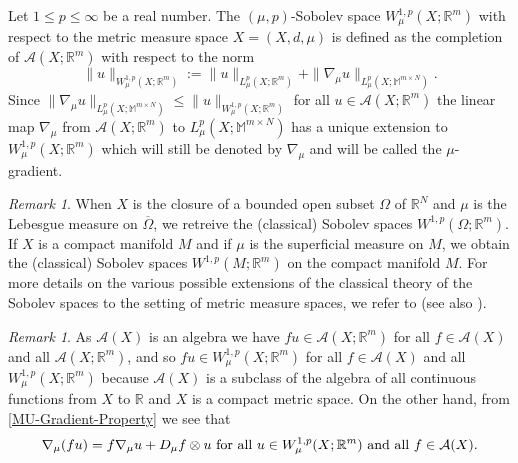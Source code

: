 \documentclass[10pt]{amsart}
\numberwithin{equation}{section}
\theoremstyle{definition}
\theoremstyle{remark}
\newtheorem{remark}[theorem]{Remark}
\begin{document}
Let $1\leq p\leq\infty$ be a real number. The $(\mu,p)$-Sobolev space $W^{1,p}_\mu(X;{{\mathbb R}}^m)$ with respect to the metric measure space $X=(X,d,\mu)$ is defined as the completion of $\mathcal{A}(X;{{\mathbb R}}^m)$ with respect to the norm
\begin{equation}\label{W1pmu-norm}
\|u\|_{W^{1,p}_\mu(X;{{\mathbb R}}^m)}:=\|u\|_{L^p_\mu(X;{{\mathbb R}}^m)}+\|\nabla_\mu u\|_{L_\mu^p(X;{{\mathbb M}^{m\times N}})}.
\end{equation}
Since $\|\nabla_\mu u\|_{L_\mu^p(X;{{\mathbb M}^{m\times N}})}\leq \|u\|_{W^{1,p}_\mu(X;{{\mathbb R}}^m)}$ for all $u\in\mathcal{A}(X;{{\mathbb R}}^m)$ the linear map $\nabla_\mu$ from $\mathcal{A}(X;{{\mathbb R}}^m)$ to $L_\mu^p(X;{{\mathbb M}^{m\times N}})$  has a unique extension to $W^{1,p}_\mu(X;{{\mathbb R}}^m)$ which will still be denoted by $\nabla_\mu$ and will be called the $\mu$-gradient.

\begin{remark}
When $X$ is the closure of a bounded open subset $\Omega$ of ${{\mathbb R}}^N$ and $\mu$ is the Lebesgue measure on $\overline{\Omega}$, we retreive the (classical) Sobolev spaces $W^{1,p}(\Omega;{{\mathbb R}}^m)$. If $X$  is a compact manifold $M$ and if $\mu$ is the superficial measure on $M$, we obtain the (classical) Sobolev spaces $W^{1,p}(M;{{\mathbb R}}^m)$ on the compact manifold $M$. For more details on the various possible extensions of the classical theory of the Sobolev spaces to the setting of metric measure spaces, we refer to \cite[\S 10-14]{heinonen07} (see also \cite{cheeger99, gol-tro01,hajlasz02}).
\end{remark}

\begin{remark}\label{Remark-MU-Gradient-Property-BiS}
As $\mathcal{A}(X)$ is an algebra we have $fu\in\mathcal{A}(X;{{\mathbb R}}^m)$ for all $f\in \mathcal{A}(X)$ and all $\mathcal{A}(X;{{\mathbb R}}^m)$, and so $fu\in W^{1,p}_\mu(X;{{\mathbb R}}^m)$ for all $f\in \mathcal{A}(X)$ and all $W^{1,p}_\mu(X;{{\mathbb R}}^m)$ because $\mathcal{A}(X)$ is a subclass of the algebra of all continuous functions from $X$ to ${{\mathbb R}}$ and $X$ is a compact metric space. On the other hand, from \eqref{MU-Gradient-Property} we see that
\begin{equation}\label{MU-Gradient-Property-BiS}
\nabla_\mu (f u)=f\nabla_\mu u+D_\mu f\otimes u\hbox{ for all }u\in W^{1,p}_\mu(X;{{\mathbb R}}^m)\hbox{ and all }f\in\mathcal{A}(X).
\end{equation}
\end{remark}
\end{document}
